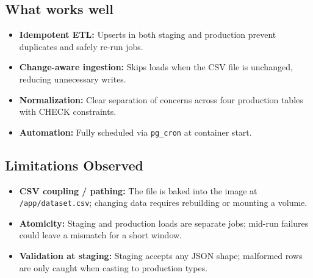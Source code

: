 \documentclass[11pt]{article}
\begin{document}
\subsection*{What works well}
\begin{itemize}[leftmargin=1.2em]
  \item \textbf{Idempotent ETL:} Upserts in both staging and production prevent duplicates and safely re-run jobs.
  \item \textbf{Change-aware ingestion:} Skips loads when the CSV file is unchanged, reducing unnecessary writes.
  \item \textbf{Normalization:} Clear separation of concerns across four production tables with CHECK constraints.
  \item \textbf{Automation:} Fully scheduled via \texttt{pg\_cron} at container start.
\end{itemize}

\subsection*{Limitations Observed}
\begin{itemize}[leftmargin=1.2em]
  \item \textbf{CSV coupling / pathing:} The file is baked into the image at \texttt{/app/dataset.csv}; changing data requires rebuilding or mounting a volume.
  \item \textbf{Atomicity:} Staging and production loads are separate jobs; mid-run failures could leave a mismatch for a short window.
  \item \textbf{Validation at staging:} Staging accepts any JSON shape; malformed rows are only caught when casting to production types.
\end{itemize}
\end{document}
